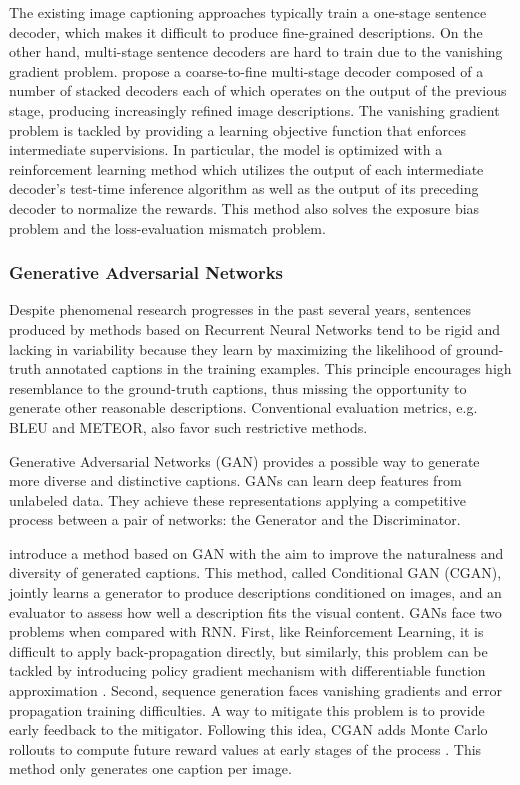 The existing image captioning approaches typically train a one-stage sentence decoder, which makes it difficult to produce fine-grained descriptions. On the other hand, multi-stage sentence decoders are hard to train due to the vanishing gradient problem. \citet{Gu2018} propose a coarse-to-fine multi-stage decoder composed of a number of stacked decoders each of which operates on the output of the previous stage, producing increasingly refined image descriptions. The vanishing gradient problem is tackled by providing a learning objective function that enforces intermediate supervisions. In particular, the model is optimized with a reinforcement learning method which utilizes the output of each intermediate decoder’s test-time inference algorithm as well as the output of its preceding decoder to normalize the rewards. This method also solves the exposure bias problem and the loss-evaluation mismatch problem.

\subsubsection{Generative Adversarial Networks}

Despite phenomenal research progresses in the past several years, sentences produced by methods based on Recurrent Neural Networks tend to be rigid and lacking in variability because they learn by maximizing the likelihood of ground-truth annotated captions in the training examples. This principle encourages high resemblance to the ground-truth captions, thus missing the opportunity to generate other reasonable descriptions. Conventional evaluation metrics, e.g. BLEU and METEOR, also favor such restrictive methods.

Generative Adversarial Networks (GAN) provides a possible way to generate more diverse and distinctive captions. GANs can learn deep features from unlabeled data. They achieve these representations applying a competitive process between a pair of networks: the Generator and the Discriminator. 

\citet{Dai2017_CGAN} introduce a method based on GAN with the aim to improve the naturalness and diversity of generated captions. This method, called Conditional GAN (CGAN), jointly learns a generator to produce descriptions conditioned on images, and an evaluator to assess how well a description fits the visual content. GANs face two problems when compared with RNN. First, like Reinforcement Learning, it is difficult to apply back-propagation directly, but similarly, this problem can be tackled by introducing policy gradient mechanism with differentiable function approximation \citep{Sutton1999}. Second, sequence generation faces vanishing gradients and error propagation training difficulties. A way to mitigate this problem is to provide early feedback to the mitigator. Following this idea, CGAN adds Monte Carlo rollouts to compute future reward values at early stages of the process \citep{Yu2017}. This method only generates one caption per image.


